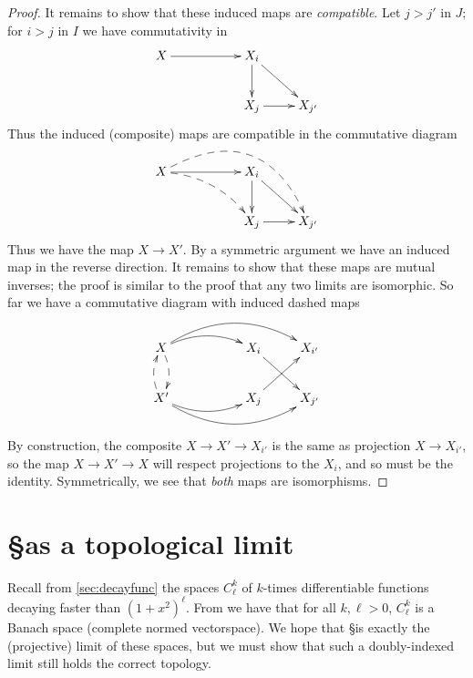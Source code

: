 \begin{proof}
          It remains to show that these induced maps are \emph{compatible}.
          Let $j>j'$ in $J$; for $i>j$ in $I$ we have commutativity in
          \begin{displaymath}
            \xymatrix{
              X \ar[rr] && X_i \ar[d] \ar[dr] \\
              && X_j \ar[r] & X_{j'}
            }
          \end{displaymath}
          Thus the induced (composite) maps are compatible in the commutative diagram
          \begin{displaymath}
            \xymatrix{
              X \ar[rr] \ar@/^35pt/@{-->}[drrr]^{} \ar@/^10pt/@{-->}[drr] && X_i \ar[d] \ar[dr] \\
              && X_j \ar[r] & X_{j'}
            }
          \end{displaymath}
          Thus we have the map $X\rightarrow X'$.
          By a symmetric argument we have an induced map in the reverse direction.
          It remains to show that these maps are mutual inverses; the proof is similar to the proof that any two limits are isomorphic.
          So far we have a commutative diagram with induced dashed maps
          \begin{displaymath}
            \xymatrix{
              X \ar@/^/@{-->}[d] \ar@/^10pt/[rr] \ar@/^20pt/[rrr]^{}
              && X_i \ar[dr] & X_{i'} \\
              X' \ar@/^/@{-->}[u] \ar@/_10pt/[rr] \ar@/_20pt/[rrr]_{}
              && X_j \ar[ur] & X_{j'}
            }
          \end{displaymath}
          By construction, the composite $X\rightarrow X' \rightarrow X_{i'}$ is the same as projection $X\rightarrow X_{i'}$, so the map $X\rightarrow X' \rightarrow X$ will respect projections to the $X_i$, and so must be the identity.
          Symmetrically, we see that \emph{both} maps are isomorphisms.
        \end{proof}

    \section{\S as a topological limit}
      Recall from \autoref{sec:decayfunc} the spaces $C^k_\ell$ of $k$-times differentiable functions decaying faster than $(1+x^2)^\ell$.
      From  we have that for all $k,\ell>0$, $C^k_\ell$ is a Banach space (complete normed vectorspace).
      We hope that \S is exactly the (projective) limit of these spaces, but we must show that such a doubly-indexed limit still holds the correct topology.

